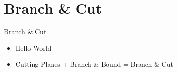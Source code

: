 \section{Branch \& Cut}

\begin{frame}{Branch \& Cut}
\begin{itemize}
\item Hello World %
\item Cutting Planes + Branch \& Bound = Branch \& Cut 
\end{itemize}
\end{frame}
